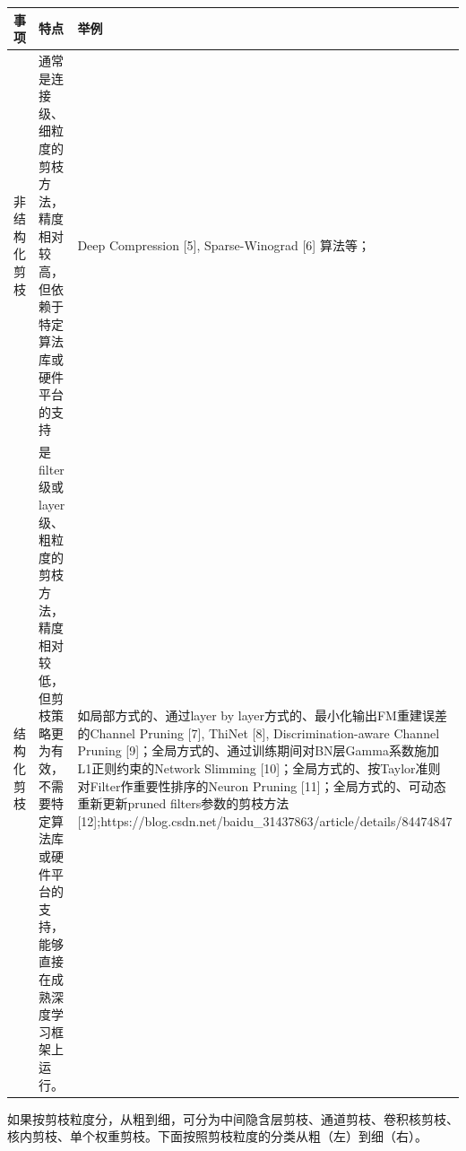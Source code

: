\begin{longtable}[]{ lll }
\toprule
\begin{minipage}[b]{0.09\columnwidth}\raggedright\strut
事项\strut
\end{minipage} & \begin{minipage}[b]{0.41\columnwidth}\raggedright\strut
特点\strut
\end{minipage} & \begin{minipage}[b]{0.41\columnwidth}\raggedright\strut
举例\strut
\end{minipage}\tabularnewline
\midrule
\endhead
\begin{minipage}[t]{0.09\columnwidth}\raggedright\strut
非结构化剪枝\strut
\end{minipage} & \begin{minipage}[t]{0.41\columnwidth}\raggedright\strut
通常是连接级、细粒度的剪枝方法，精度相对较高，但依赖于特定算法库或硬件平台的支持\strut
\end{minipage} & \begin{minipage}[t]{0.41\columnwidth}\raggedright\strut
Deep Compression {[}5{]}, Sparse-Winograd {[}6{]} 算法等；\strut
\end{minipage}\tabularnewline
\begin{minipage}[t]{0.09\columnwidth}\raggedright\strut
结构化剪枝\strut
\end{minipage} & \begin{minipage}[t]{0.41\columnwidth}\raggedright\strut
是filter级或layer级、粗粒度的剪枝方法，精度相对较低，但剪枝策略更为有效，不需要特定算法库或硬件平台的支持，能够直接在成熟深度学习框架上运行。\strut
\end{minipage} & \begin{minipage}[t]{0.41\columnwidth}\raggedright\strut
如局部方式的、通过layer by layer方式的、最小化输出FM重建误差的Channel
Pruning {[}7{]}, ThiNet {[}8{]}, Discrimination-aware Channel Pruning
{[}9{]}；全局方式的、通过训练期间对BN层Gamma系数施加L1正则约束的Network
Slimming {[}10{]}；全局方式的、按Taylor准则对Filter作重要性排序的Neuron
Pruning {[}11{]}；全局方式的、可动态重新更新pruned filters参数的剪枝方法
{[}12{]};https://blog.csdn.net/baidu\_31437863/article/details/84474847\strut
\end{minipage}\tabularnewline
\bottomrule
\end{longtable}

如果按剪枝粒度分，从粗到细，可分为中间隐含层剪枝、通道剪枝、卷积核剪枝、核内剪枝、单个权重剪枝。下面按照剪枝粒度的分类从粗（左）到细（右）。


